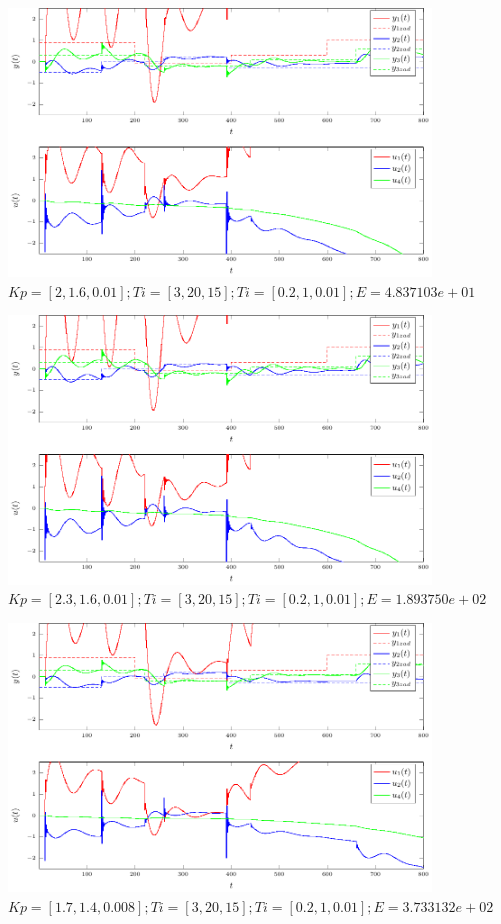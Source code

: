 \documentclass[a4paper,titlepage,11pt,twosides,floatssmall]{mwrep}
\begin{document}
\begin{figure}[H]
	\centering
	\includegraphics[scale=1]{../wykresy/zad4_pid_6_1.pdf}
	\caption{$Kp = [2, 1.6, 0.01]; Ti = [3, 20, 15]; Ti = [0.2, 1, 0.01]; E = 4.837103e+01$}
\end{figure}

\begin{figure}[H]
	\centering
	\includegraphics[scale=1]{../wykresy/zad4_pid_6_2.pdf}
	\caption{$Kp = [2.3, 1.6, 0.01]; Ti = [3, 20, 15]; Ti = [0.2, 1, 0.01]; E = 1.893750e+02$}
\end{figure}

\begin{figure}[H]
	\centering
	\includegraphics[scale=1]{../wykresy/zad4_pid_6_3.pdf}
	\caption{$Kp = [1.7, 1.4, 0.008]; Ti = [3, 20, 15]; Ti = [0.2, 1, 0.01]; E = 3.733132e+02$}
\end{figure}
\end{document}
